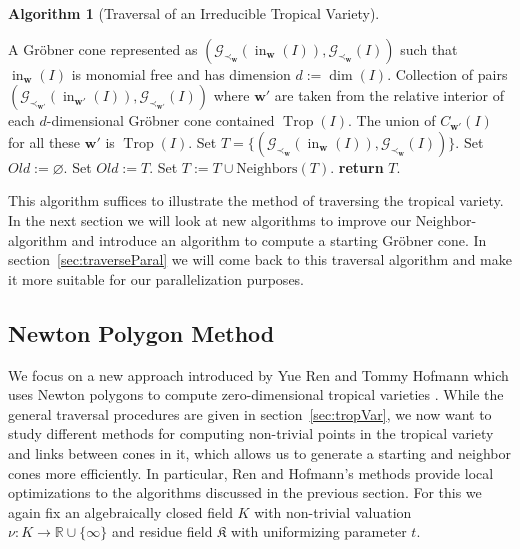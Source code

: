 \documentclass[
  paper=a4,
  titlepage,
  bibliography=totoc,
  listof=totoc,
  pagesize=pdftex
]{scrartcl}
\numberwithin{figure}{section}
\numberwithin{equation}{section}
\numberwithin{table}{section}
\newcommand*\setR{\mathds{R}}
\let\vec\mathbf
\DeclareMathOperator{\Trop}{Trop}
\DeclareMathOperator{\initial}{in}
\theoremstyle{definition}
\newtheorem{algo}[definition]{Algorithm}
\numberwithin{definition}{section}
\begin{document}
\begin{algo}[Traversal of an Irreducible Tropical Variety]\
  \label{alg:traversal}
  \begin{algorithmic}[1]
    \Require A Gröbner cone represented as $(\mathcal G_{\prec_{\vec w}}(\initial_{\vec
      w}(I)), \mathcal G_{\prec_{\vec w}}(I))$ such that $\initial_{\vec w}(I)$ is
      monomial free and has dimension $d:=\dim(I)$.
    \Ensure Collection of pairs $(\mathcal G_{\prec_{\vec w'}}(\initial_{\vec
      w'}(I)), \mathcal G_{\prec_{\vec w'}}(I))$ where $\vec w'$ are taken from the
      relative interior of each $d$-dimensional Gröbner cone contained $\Trop(I)$. The
      union of $C_{\vec w'}(I)$ for all these $\vec w'$ is $\Trop(I)$.
    \State Set $T = \{ (\mathcal G_{\prec_{\vec w}}(\initial_{\vec
      w}(I)), \mathcal G_{\prec_{\vec w}}(I)) \}$.
    \State Set $Old := \varnothing$.
      \State Set $Old := T$.
      \State Set $T := T \cup \mathrm{Neighbors}(T)$.
    \EndWhile
    \State\textbf{return} $T$.
  \end{algorithmic}
\end{algo}

This algorithm suffices to illustrate the method of traversing the tropical variety. In
the next section we will look at new algorithms to improve our Neighbor-algorithm and
introduce an algorithm to compute a starting Gröbner cone. In
section~\ref{sec:traverseParal} we will come back to this traversal algorithm and make it
more suitable for our parallelization purposes.

\subsection{Newton Polygon Method}
\label{sec:newtonMethod}

We focus on a new approach introduced by Yue Ren and Tommy Hofmann which uses Newton
polygons to compute zero-dimensional tropical varieties \cite{tropPointsLinks}. While the
general traversal procedures are given in section~\ref{sec:tropVar}, we now want to study
different methods for computing non-trivial points in the tropical variety and links
between cones in it, which allows us to generate a starting and neighbor cones more
efficiently. In particular, Ren and Hofmann's methods provide local optimizations to the
algorithms discussed in the previous section. For this we again fix an algebraically
closed field $K$ with non-trivial valuation $\nu:K\to\setR \cup \{\infty\}$ and
residue field $\mathfrak K$ with uniformizing parameter $t$.
\end{document}
